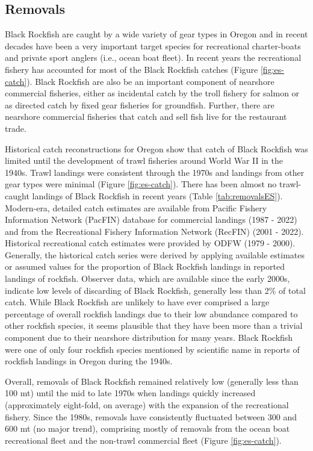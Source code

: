 \documentclass[11pt,
  english,
  letterpaper,
]{article}
\begin{document}
\hypertarget{removals}{%
\subsection*{Removals}\label{removals}}

Black Rockfish are caught by a wide variety of gear types in Oregon and in recent decades have been a very important target species for recreational charter-boats and private sport anglers (i.e., ocean boat fleet). In recent years the recreational fishery has accounted for most of the Black Rockfish catches (Figure \ref{fig:es-catch}). Black Rockfish are also be an important component of nearshore commercial fisheries, either as incidental catch by the troll fishery for salmon or as directed catch by fixed gear fisheries for groundfish. Further, there are nearshore commercial fisheries that catch and sell fish live for the restaurant trade.

Historical catch reconstructions for Oregon show that catch of Black Rockfish was limited until the development of trawl fisheries around World War II in the 1940s. Trawl landings were consistent through the 1970s and landings from other gear types were minimal (Figure \ref{fig:es-catch}). There has been almost no trawl-caught landings of Black Rockfish in recent years (Table \ref{tab:removalsES}). Modern-era, detailed catch estimates are available from Pacific Fishery Information Network (PacFIN) database for commercial landings (1987 - 2022) and from the Recreational Fishery Information Network (RecFIN) (2001 - 2022). Historical recreational catch estimates were provided by ODFW (1979 - 2000). Generally, the historical catch series were derived by applying available estimates or assumed values for the proportion of Black Rockfish landings in reported landings of rockfish. Observer data, which are available since the early 2000s, indicate low levels of discarding of Black Rockfish, generally less than 2\% of total catch. While Black Rockfish are unlikely to have ever comprised a large percentage of overall rockfish landings due to their low abundance compared to other rockfish species, it seems plausible that they have been more than a trivial component due to their nearshore distribution for many years. Black Rockfish were one of only four rockfish species mentioned by scientific name in reports of rockfish landings in Oregon during the 1940s.

Overall, removals of Black Rockfish remained relatively low (generally less than 100 mt) until the mid to late 1970s when landings quickly increased (approximately eight-fold, on average) with the expansion of the recreational fishery. Since the 1980s, removals have consistently fluctuated between 300 and 600 mt (no major trend), comprising mostly of removals from the ocean boat recreational fleet and the non-trawl commercial fleet (Figure \ref{fig:es-catch}).
\end{document}
